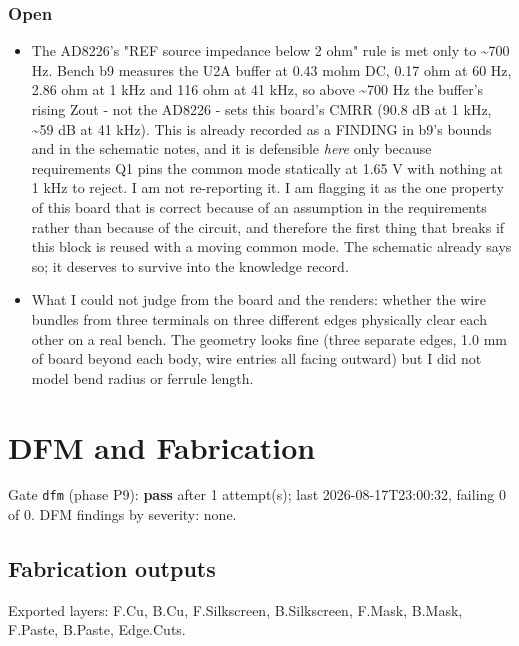 \documentclass[11pt,a4paper]{article}
\begin{document}
\subsubsection*{Open}
\begin{itemize}
\item The AD8226's "REF source impedance below 2 ohm" rule is met only to \textasciitilde{}700 Hz.
Bench b9 measures the U2A buffer at 0.43 mohm DC, 0.17 ohm at 60 Hz, 2.86 ohm
at 1 kHz and 116 ohm at 41 kHz, so above \textasciitilde{}700 Hz the buffer's rising Zout -
not the AD8226 - sets this board's CMRR (90.8 dB at 1 kHz, \textasciitilde{}59 dB at 41 kHz).
This is already recorded as a FINDING in b9's bounds and in the schematic
notes, and it is defensible \emph{here} only because requirements Q1 pins the common
mode statically at 1.65 V with nothing at 1 kHz to reject. I am not
re-reporting it. I am flagging it as the one property of this board that is
correct because of an assumption in the requirements rather than because of the
circuit, and therefore the first thing that breaks if this block is reused with
a moving common mode. The schematic already says so; it deserves to survive
into the knowledge record.
\item What I could not judge from the board and the renders: whether the wire bundles
from three terminals on three different edges physically clear each other on a
real bench. The geometry looks fine (three separate edges, 1.0 mm of board
beyond each body, wire entries all facing outward) but I did not model bend
radius or ferrule length.
\end{itemize}
\section{DFM and Fabrication}
Gate \texttt{dfm} (phase P9): \textbf{pass} after 1 attempt(s); last 2026-08-17T23:00:32, failing 0 of 0.
DFM findings by severity: none.
\subsection*{Fabrication outputs}
Exported layers: F.Cu, B.Cu, F.Silkscreen, B.Silkscreen, F.Mask, B.Mask, F.Paste, B.Paste, Edge.Cuts.
\end{document}
